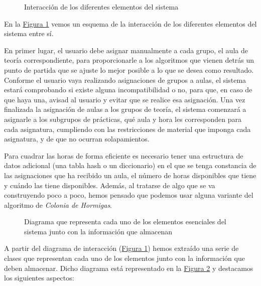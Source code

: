\begin{figure}[!h]
    \centering
    
    \caption{Interacción de los diferentes elementos del sistema}
    \label{interaccion}
\end{figure}

En la \hyperref[interaccion]{Figura \ref*{interaccion}} vemos un esquema de la interacción de los diferentes elementos del sistema entre sí. 

En primer lugar, el usuario debe asignar manualmente a cada grupo, el aula de teoría correspondiente, para proporcionarle a los algoritmos que vienen detrás un punto de partida que se ajuste lo mejor posible a lo que se desea como resultado. Conforme el usuario vaya realizando asignaciones de grupos a aulas, el sistema estará comprobando si existe alguna incompatibilidad o no, para que, en caso de que haya una, avisad al usuario y evitar que se realice esa asignación. Una vez finalizada la asignación de aulas a los grupos de teoría, el sistema comenzará a asignarle a los subgrupos de prácticas, qué aula y hora les corresponden para cada asignatura, cumpliendo con las restricciones de material que imponga cada asignatura, y de que no ocurran solapamientos.

Para cuadrar las horas de forma eficiente es necesario tener una estructura de datos adicional (una tabla hash o un diccionario) en el que se tenga constancia de las asignaciones que ha recibido un aula, el número de horas disponibles que tiene y cuándo las tiene disponibles. Además, al tratarse de algo que se va construyendo poco a poco, hemos pensado que podemos usar alguna variante del algoritmo de \textit{Colonia de Hormigas}.

\begin{figure}[!h]
    \centering
    
    \caption{Diagrama que representa cada uno de los elementos esenciales del sistema junto con la información que almacenan}
    \label{clases}
\end{figure}

A partir del diagrama de interacción (\hyperref[interaccion]{Figura \ref*{interaccion}}) hemos extraído una serie de clases que representan cada uno de los elementos junto con la información que deben almacenar. Dicho diagrama está representado en la \hyperref[clases]{Figura \ref*{clases}} y destacamos los siguientes aspectos:

